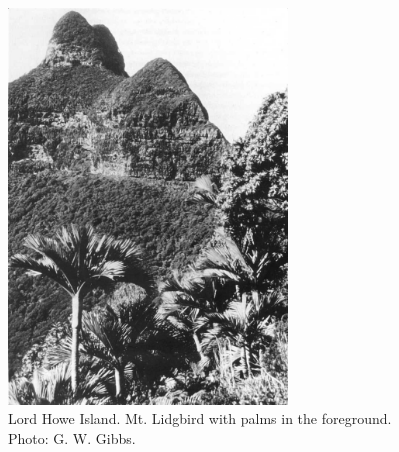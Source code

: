 \begin{figure}
	\includegraphics[width=0.66\textwidth]{graphics/fig_120}
	\centering
	\caption[Lord Howe Island]{Lord Howe Island.
	Mt. Lidgbird with  palms in the foreground.
	Photo: G. W. Gibbs.}%
	\label{fig:120lord-howe-island}
\end{figure}

